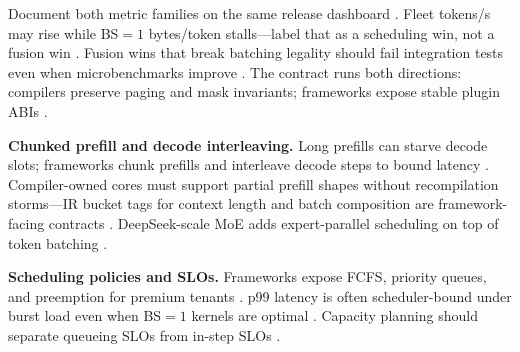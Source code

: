 Document both metric families on the same release dashboard \citep{patel2025llminference,kwon2023vllm,memoryfloor2026,taxbreak2026,yirage2026,chen2020compilerbasedhardw,dlbook,nvidia2024cudagraphs,dao2022flashattention,liu2024deepseekv3,semianalysis2024tma,amd2024xdna,amd2024aie,dao2023flashdecoding,nvidia2022hopper,dlbook}. Fleet tokens/s may rise while BS${=}1$ bytes/token stalls---label that as a scheduling win, not a fusion win \citep{taxbreak2026,memoryfloor2026,patel2025llminference,yirage2026,chen2020compilerbasedhardw,kwon2023vllm,dlbook}. Fusion wins that break batching legality should fail integration tests even when microbenchmarks improve \citep{yirage2026,chen2020compilerbasedhardw,kwon2023vllm,nvidia2024cudagraphs,patel2025llminference,memoryfloor2026,taxbreak2026,dao2022flashattention,dlbook}. The contract runs both directions: compilers preserve paging and mask invariants; frameworks expose stable plugin ABIs \citep{patel2025llminference,yirage2026,chen2020compilerbasedhardw,kwon2023vllm,taxbreak2026,memoryfloor2026,nvidia2024cudagraphs,dao2022flashattention,liu2024deepseekv3,semianalysis2024tma,amd2024aie,amd2024xdna,dao2023flashdecoding,nvidia2022hopper,dlbook}.

\textbf{Chunked prefill and decode interleaving.} Long prefills can starve decode slots; frameworks chunk prefills and interleave decode steps to bound latency \citep{kwon2023vllm,patel2025llminference,liu2024deepseekv3}. Compiler-owned cores must support partial prefill shapes without recompilation storms---IR bucket tags for context length and batch composition are framework-facing contracts \citep{yirage2026,chen2020compilerbasedhardw,nvidia2024cudagraphs,memoryfloor2026}. DeepSeek-scale MoE adds expert-parallel scheduling on top of token batching \citep{liu2024deepseekv3,patel2025llminference,yirage2026,chen2020compilerbasedhardw,kwon2023vllm,taxbreak2026}.

\textbf{Scheduling policies and SLOs.} Frameworks expose FCFS, priority queues, and preemption for premium tenants \citep{kwon2023vllm,patel2025llminference,dlbook,memoryfloor2026,taxbreak2026,yirage2026,chen2020compilerbasedhardw,liu2024deepseekv3,nvidia2024cudagraphs,dao2022flashattention,semianalysis2024tma,amd2024xdna,amd2024aie,dlbook}. p99 latency is often scheduler-bound under burst load even when BS${=}1$ kernels are optimal \citep{patel2025llminference,memoryfloor2026,kwon2023vllm,taxbreak2026,yirage2026,chen2020compilerbasedhardw,dlbook}. Capacity planning should separate queueing SLOs from in-step SLOs \citep{patel2025llminference,kwon2023vllm,memoryfloor2026,taxbreak2026,yirage2026,chen2020compilerbasedhardw,dlbook,liu2024deepseekv3,nvidia2024cudagraphs,dao2022flashattention,dao2023flashdecoding,semianalysis2024tma,amd2024aie,amd2024xdna,dlbook}.

